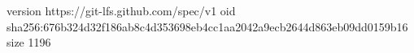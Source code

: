 version https://git-lfs.github.com/spec/v1
oid sha256:676b324d32f186ab8c4d353698eb4cc1aa2042a9ecb2644d863eb09dd0159b16
size 1196
